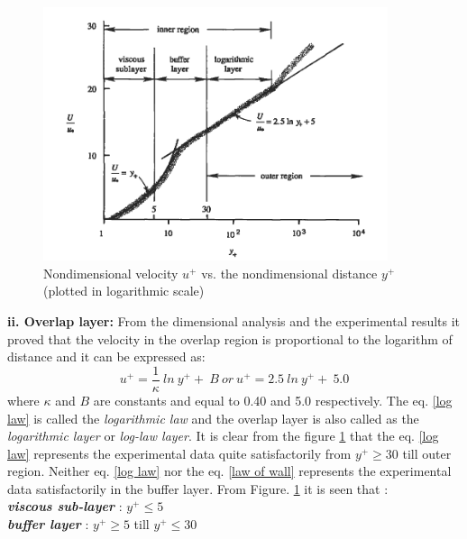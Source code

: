 \begin{figure}[t]
    \centering
    \includegraphics[width=0.9\textwidth]{figur/Log-law-plot.png}
    \caption{Nondimensional velocity $u^+$ vs. the nondimensional distance $y^+$ (plotted in logarithmic scale) ~\cite{kundu:book}}
    \label{log-log plot}
\end{figure}


\textbf{ii. Overlap layer:} From the dimensional analysis and the experimental results it proved that the velocity in the overlap region is proportional to the logarithm of distance and it can be expressed as: 
\begin{equation}
	\label{log law}
	u^+ = \frac{1}{\kappa}\ ln\ y^+ + \ B \ or \  u^+ = 2.5\ ln\ y^+ + \ 5.0 
\end{equation}
where $\kappa$ and $B$ are constants and equal to 0.40 and 5.0 respectively. The eq. \ref{log law} is called the \emph{logarithmic law} and the overlap layer is also called as the \emph{logarithmic layer} or \emph{log-law layer}. It is clear from the figure \ref{log-log plot} that the eq. \ref{log law} represents the experimental data quite satisfactorily from $y^+ \geq 30$ till outer region. Neither eq. \ref{log law} nor the eq. \ref{law of wall} represents the experimental data satisfactorily in the buffer layer.
From Figure. \ref{log-log plot} it is seen that :\\

\emph{\textbf{viscous sub-layer}	} : $y^+ \leq  5$ \\ 

\emph{\textbf{buffer layer}} : $y^+ \geq  5$ till $y^+ \leq  30$ \\

